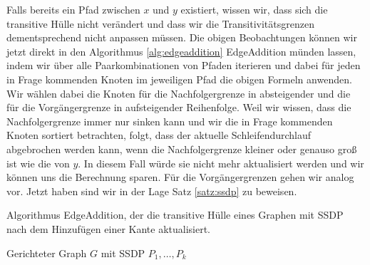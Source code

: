 Falls bereits ein Pfad zwischen $x$ und $y$ existiert, wissen wir, dass sich die transitive Hülle nicht verändert und dass wir die Transitivitätsgrenzen dementsprechend nicht anpassen müssen. Die obigen Beobachtungen können wir jetzt direkt in den Algorithmus \ref{alg:edgeaddition} \textrm{EdgeAddition} münden lassen, indem wir über alle Paarkombinationen von Pfaden iterieren und dabei für jeden in Frage kommenden Knoten im jeweiligen Pfad die obigen Formeln anwenden. Wir wählen dabei die Knoten für die Nachfolgergrenze in absteigender und die für die Vorgängergrenze in aufsteigender Reihenfolge. Weil wir wissen, dass die Nachfolgergrenze immer nur sinken kann und wir die in Frage kommenden Knoten sortiert betrachten, folgt, dass der aktuelle Schleifendurchlauf abgebrochen werden kann, wenn die Nachfolgergrenze kleiner oder genauso groß ist wie die von $y$. In diesem Fall würde sie nicht mehr aktualisiert werden und wir können uns die Berechnung sparen. Für die Vorgängergrenzen gehen wir analog vor. Jetzt haben sind wir in der Lage Satz \ref{satz:ssdp} zu beweisen.

\begin{algorithm}
	\caption{Algorithmus EdgeAddition, der die transitive Hülle eines Graphen mit SSDP nach dem Hinzufügen einer Kante aktualisiert.}
	\label{alg:edgeaddition}
	\begin{algorithmic}[1]
		\Require Gerichteter Graph $G$ mit SSDP $P_1, \dots, P_k$
			\label{alg:pathIf}
							 \label{alg:succ_if}
								\label{algl:succ}
							\Else
							\EndIf
							 \label{alg:pred_if}
								\label{algl:pred}
							\Else
							\EndIf
			\EndIf
		\EndProcedure
	\end{algorithmic}
\end{algorithm}

